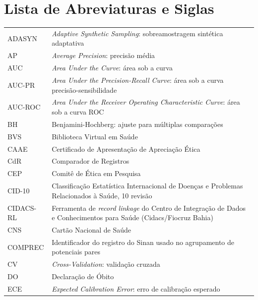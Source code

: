 \chapter*{Lista de Abreviaturas e Siglas}

\vspace{12pt}

\noindent
\begin{longtable}{@{}l@{\hspace{1.5em}}p{12cm}@{}}
ADASYN   & \textit{Adaptive Synthetic Sampling}: sobreamostragem sint\'{e}tica adaptativa \\[6pt]
AP       & \textit{Average Precision}: precis\~{a}o m\'{e}dia \\[6pt]
AUC      & \textit{Area Under the Curve}: \'{a}rea sob a curva \\[6pt]
AUC-PR   & \textit{Area Under the Precision-Recall Curve}: \'{a}rea sob a curva precis\~{a}o-sensibilidade \\[6pt]
AUC-ROC  & \textit{Area Under the Receiver Operating Characteristic Curve}: \'{a}rea sob a curva ROC \\[6pt]
BH & Benjamini-Hochberg: ajuste para múltiplas comparações \\[6pt]
BVS      & Biblioteca Virtual em Sa\'{u}de \\[6pt]
CAAE     & Certificado de Apresenta\c{c}\~{a}o de Aprecia\c{c}\~{a}o \'{E}tica \\[6pt]
CdR      & Comparador de Registros \\[6pt]
CEP      & Comit\^{e} de \'{E}tica em Pesquisa \\[6pt]
CID-10   & Classifica\c{c}\~{a}o Estat\'{i}stica Internacional de Doen\c{c}as e Problemas Relacionados \`{a} Sa\'{u}de, 10\textordfeminine{} revis\~{a}o \\[6pt]
CIDACS-RL & Ferramenta de \textit{record linkage} do Centro de Integra\c{c}\~{a}o de Dados e Conhecimentos para Sa\'{u}de (Cidacs/Fiocruz Bahia) \\[6pt]
CNS      & Cart\~{a}o Nacional de Sa\'{u}de \\[6pt]
COMPREC  & Identificador do registro do Sinan usado no agrupamento de potenciais pares \\[6pt]
CV       & \textit{Cross-Validation}: valida\c{c}\~{a}o cruzada \\[6pt]
DO       & Declara\c{c}\~{a}o de \'{O}bito \\[6pt]
ECE      & \textit{Expected Calibration Error}: erro de calibra\c{c}\~{a}o esperado \\[6pt]

\end{longtable}
